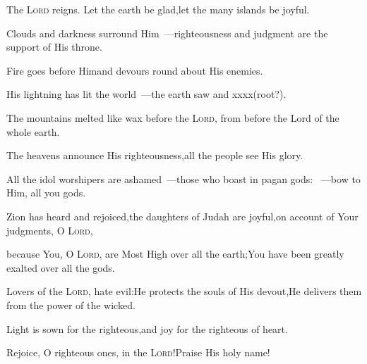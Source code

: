 
\begin{inparaenum}
  \pa {} The \textsc{Lord} reigns. Let the earth be glad,\pa let the many islands%
  be joyful.%
  
  \pa {} Clouds and darkness surround Him~---\pa righteousness and judgment are the support of His throne.%
  
  \pa {} Fire goes before Him\pa and devours round about His%
  enemies.%
  
  \pa {} His lightning has lit the world~---\pa the earth saw and xxxx(root?).%
  
  \pa {} The mountains melted like wax%
  before the \textsc{Lord},%
  \pa from before%
  the Lord of the whole earth.%
  
  \pa {} The heavens announce His righteousness,\pa all the people see His glory.%
  
  \pa {} All the idol worshipers are ashamed~---\pa those who boast in pagan gods:%
  ~---\pa bow%
  to Him, all you gods.%
  
  \pa {} Zion has heard and rejoiced,\pa the daughters of Judah are joyful,\pa on account of Your judgments, O \textsc{Lord},%
  
  \pa {} because You, O \textsc{Lord},%
  are Most High over all the earth;\pa You have been greatly exalted over all the gods.%
  
  \pa {} Lovers of the \textsc{Lord}, hate evil:\pa He protects the souls of His devout,\pa He delivers them from the power of the wicked.%
  
  \pa {} Light is sown%
  for the righteous,\pa and joy for the righteous of heart.%
  
  \pa {} Rejoice, O righteous ones, in the \textsc{Lord}!\pa Praise His holy name!%
\end{inparaenum}
